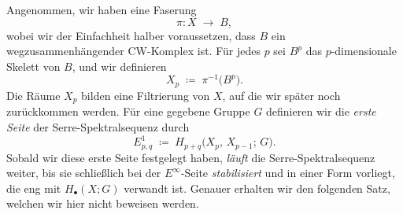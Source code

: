 \documentclass[12pt, hidelinks]{article}
\numberwithin{conj}{section}
\begin{document}
                \noindent
                Angenommen, wir haben eine Faserung 
                \[
                    \pi: X \;\longrightarrow\; B,
                \]
                wobei wir der Einfachheit halber voraussetzen, dass $B$ ein wegzusammenhängender CW-Komplex ist. Für jedes $p$ sei $B^p$ das $p$-dimensionale Skelett von $B$, und wir definieren
                \[
                    X_p \;\coloneqq\; \pi^{-1}\bigl(B^p\bigr).
                \]
                Die Räume $X_p$ bilden eine Filtrierung von $X$, auf die wir später noch zurückkommen werden. Für eine gegebene Gruppe $G$ definieren wir die \emph{erste Seite} der Serre-Spektralsequenz durch
                \[
                    E^1_{p,q}
                    \;\coloneqq\;
                    H_{p+q}\bigl(X_p,\,X_{p-1};\,G\bigr).
                \]
                Sobald wir diese erste Seite festgelegt haben, \emph{läuft} die Serre-Spektralsequenz weiter, bis sie schließlich bei der $E^\infty$-Seite \emph{stabilisiert} und in einer Form vorliegt, die eng mit $H_{\bullet}(X;G)$ verwandt ist. Genauer erhalten wir den folgenden Satz, welchen wir hier nicht beweisen werden.
                
\end{document}
